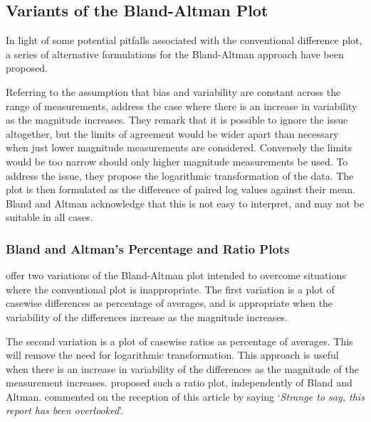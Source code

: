 \documentclass[12pt, a4paper]{report}
\begin{document}
	\subsection{Variants of the Bland-Altman Plot}
	In light of some potential pitfalls associated with the conventional difference plot, a series of alternative formulations for the Bland-Altman approach have been proposed.
	
	Referring to the assumption that bias and variability are constant across the range
	of measurements, \citet{BA99} address the case where there is an increase in variability as the magnitude increases. They remark 	that it is possible to ignore the issue altogether, but the limits of agreement would be wider apart than necessary when just lower magnitude measurements are considered. Conversely the limits would be too narrow should only higher magnitude measurements be used.	To address the issue, they propose the logarithmic transformation of the data. The plot is then formulated as the difference of paired log values against their mean. Bland and Altman acknowledge that this is not easy to interpret, and may not be suitable in all cases.
	
	\subsubsection*{Bland and Altman's Percentage and Ratio Plots}
	\citet{BA99} offer two variations of the Bland-Altman plot intended to overcome situations where the conventional plot is inappropriate. The first variation is a plot of casewise differences as percentage of averages, and is appropriate when the variability of the differences increase as the
	magnitude increases. 
	
	The second variation is a plot of casewise ratios as percentage of averages. This will remove the need for
	logarithmic transformation. This approach is useful when there is an increase in variability of the differences as the magnitude of the measurement increases. \citet{Eksborg} proposed such a ratio plot,
	independently of Bland and Altman. \citet{Dewitte} commented on
	the reception of this article by saying `\textit{Strange to say, this 
		report has been overlooked}'.
	
\end{document}
